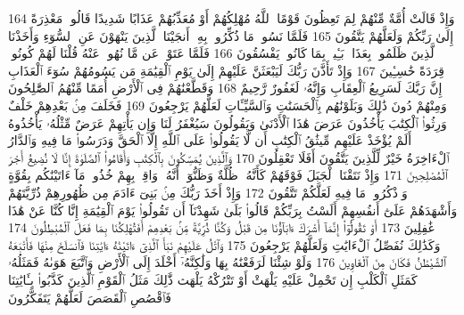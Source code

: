 {\tiny\colorbox{cl_aya}{164}} وَإِذْ قَالَتْ أُمَّةٌ مِّنْهُمْ لِمَ تَعِظُونَ قَوْمًا ٱللَّهُ مُهْلِكُهُمْ أَوْ مُعَذِّبُهُمْ عَذَابًا شَدِيدًا قَالُوا۟ مَعْذِرَةً إِلَىٰ رَبِّكُمْ وَلَعَلَّهُمْ يَتَّقُونَ
{\tiny\colorbox{cl_aya}{165}} فَلَمَّا نَسُوا۟ مَا ذُكِّرُوا۟ بِهِۦٓ أَنجَيْنَا ٱلَّذِينَ يَنْهَوْنَ عَنِ ٱلسُّوٓءِ وَأَخَذْنَا ٱلَّذِينَ ظَلَمُوا۟ بِعَذَابٍۭ بَـِٔيسٍۭ بِمَا كَانُوا۟ يَفْسُقُونَ
{\tiny\colorbox{cl_aya}{166}} فَلَمَّا عَتَوْا۟ عَن مَّا نُهُوا۟ عَنْهُ قُلْنَا لَهُمْ كُونُوا۟ قِرَدَةً خَٰسِـِٔينَ
{\tiny\colorbox{cl_aya}{167}} وَإِذْ تَأَذَّنَ رَبُّكَ لَيَبْعَثَنَّ عَلَيْهِمْ إِلَىٰ يَوْمِ ٱلْقِيَٰمَةِ مَن يَسُومُهُمْ سُوٓءَ ٱلْعَذَابِ إِنَّ رَبَّكَ لَسَرِيعُ ٱلْعِقَابِ وَإِنَّهُۥ لَغَفُورٌ رَّحِيمٌ
{\tiny\colorbox{cl_aya}{168}} وَقَطَّعْنَٰهُمْ فِى ٱلْأَرْضِ أُمَمًا مِّنْهُمُ ٱلصَّٰلِحُونَ وَمِنْهُمْ دُونَ ذَٰلِكَ وَبَلَوْنَٰهُم بِٱلْحَسَنَٰتِ وَٱلسَّيِّـَٔاتِ لَعَلَّهُمْ يَرْجِعُونَ
{\tiny\colorbox{cl_aya}{169}} فَخَلَفَ مِنۢ بَعْدِهِمْ خَلْفٌ وَرِثُوا۟ ٱلْكِتَٰبَ يَأْخُذُونَ عَرَضَ هَٰذَا ٱلْأَدْنَىٰ وَيَقُولُونَ سَيُغْفَرُ لَنَا وَإِن يَأْتِهِمْ عَرَضٌ مِّثْلُهُۥ يَأْخُذُوهُ أَلَمْ يُؤْخَذْ عَلَيْهِم مِّيثَٰقُ ٱلْكِتَٰبِ أَن لَّا يَقُولُوا۟ عَلَى ٱللَّهِ إِلَّا ٱلْحَقَّ وَدَرَسُوا۟ مَا فِيهِ وَٱلدَّارُ ٱلْءَاخِرَةُ خَيْرٌ لِّلَّذِينَ يَتَّقُونَ أَفَلَا تَعْقِلُونَ
{\tiny\colorbox{cl_aya}{170}} وَٱلَّذِينَ يُمَسِّكُونَ بِٱلْكِتَٰبِ وَأَقَامُوا۟ ٱلصَّلَوٰةَ إِنَّا لَا نُضِيعُ أَجْرَ ٱلْمُصْلِحِينَ
{\tiny\colorbox{cl_aya}{171}} وَإِذْ نَتَقْنَا ٱلْجَبَلَ فَوْقَهُمْ كَأَنَّهُۥ ظُلَّةٌ وَظَنُّوٓا۟ أَنَّهُۥ وَاقِعٌۢ بِهِمْ خُذُوا۟ مَآ ءَاتَيْنَٰكُم بِقُوَّةٍ وَٱذْكُرُوا۟ مَا فِيهِ لَعَلَّكُمْ تَتَّقُونَ
{\tiny\colorbox{cl_aya}{172}} وَإِذْ أَخَذَ رَبُّكَ مِنۢ بَنِىٓ ءَادَمَ مِن ظُهُورِهِمْ ذُرِّيَّتَهُمْ وَأَشْهَدَهُمْ عَلَىٰٓ أَنفُسِهِمْ أَلَسْتُ بِرَبِّكُمْ قَالُوا۟ بَلَىٰ شَهِدْنَآ أَن تَقُولُوا۟ يَوْمَ ٱلْقِيَٰمَةِ إِنَّا كُنَّا عَنْ هَٰذَا غَٰفِلِينَ
{\tiny\colorbox{cl_aya}{173}} أَوْ تَقُولُوٓا۟ إِنَّمَآ أَشْرَكَ ءَابَآؤُنَا مِن قَبْلُ وَكُنَّا ذُرِّيَّةً مِّنۢ بَعْدِهِمْ أَفَتُهْلِكُنَا بِمَا فَعَلَ ٱلْمُبْطِلُونَ
{\tiny\colorbox{cl_aya}{174}} وَكَذَٰلِكَ نُفَصِّلُ ٱلْءَايَٰتِ وَلَعَلَّهُمْ يَرْجِعُونَ
{\tiny\colorbox{cl_aya}{175}} وَٱتْلُ عَلَيْهِمْ نَبَأَ ٱلَّذِىٓ ءَاتَيْنَٰهُ ءَايَٰتِنَا فَٱنسَلَخَ مِنْهَا فَأَتْبَعَهُ ٱلشَّيْطَٰنُ فَكَانَ مِنَ ٱلْغَاوِينَ
{\tiny\colorbox{cl_aya}{176}} وَلَوْ شِئْنَا لَرَفَعْنَٰهُ بِهَا وَلَٰكِنَّهُۥٓ أَخْلَدَ إِلَى ٱلْأَرْضِ وَٱتَّبَعَ هَوَىٰهُ فَمَثَلُهُۥ كَمَثَلِ ٱلْكَلْبِ إِن تَحْمِلْ عَلَيْهِ يَلْهَثْ أَوْ تَتْرُكْهُ يَلْهَث ذَّٰلِكَ مَثَلُ ٱلْقَوْمِ ٱلَّذِينَ كَذَّبُوا۟ بِـَٔايَٰتِنَا فَٱقْصُصِ ٱلْقَصَصَ لَعَلَّهُمْ يَتَفَكَّرُونَ
